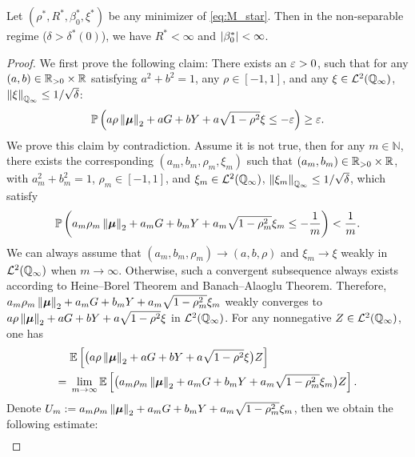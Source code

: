 \begin{lem}\label{lem:boundedness_parameter}
    Let $(\rho^*, R^*, \beta_0^*, \xi^*)$ be any minimizer of \cref{eq:M_star}. Then in the non-separable regime ($\delta > \delta^*(0)$), we have $R^* < \infty$ and $\left|{\beta_0^*}\right| < \infty$.
\end{lem}
\begin{proof}
    We first prove the following claim: There exists an $\varepsilon > 0$, such that for any $(a, b) \in \mathbb{R}_{> 0} \times \mathbb{R}$ satisfying $a^2 + b^2 = 1$, any $\rho \in [-1, 1]$, and any $\xi \in \mathcal{L}^2 (\mathbb{Q}_\infty)$, $\left\|{\xi}\right\|_{\mathbb{Q}_\infty} \le 1 / \sqrt{\delta}$:
    \begin{equation}
    \label{eq:V_claim}
        \mathbb{P} \left( a \rho \left\|{\text{\boldmath $\mu$}}\right\|_2 + a G + b Y + a \sqrt{1 - \rho^2} \xi \le - \varepsilon \right) \ge \varepsilon.
    \end{equation}
    We prove this claim by contradiction. Assume it is not true, then for any $m \in \mathbb{N}$, there exists the corresponding $(a_m, b_m, \rho_m, \xi_m)$ such that $(a_m, b_m) \in \mathbb{R}_{> 0} \times \mathbb{R}$, with $a_m^2 + b_m^2 = 1$, $\rho_m \in [-1, 1]$, and $\xi_m \in \mathcal{L}^2 (\mathbb{Q}_\infty)$, $\left\|{\xi_m}\right\|_{\mathbb{Q}_\infty} \le 1 / \sqrt{\delta}$, which satisfy
    \begin{equation}
    \label{eq:Vm_bound}
        \mathbb{P} \left( a_m \rho_m \left\|{\text{\boldmath $\mu$}}\right\|_2 + a_m G + b_m Y + a_m \sqrt{1 - \rho_m^2} \xi_m \le - \frac{1}{m} \right) < \frac{1}{m}.
    \end{equation}
    We can always assume that $(a_m, b_m, \rho_m) \to (a, b, \rho)$ and $\xi_m \to \xi$ weakly in $\mathcal{L}^2 (\mathbb{Q}_\infty)$ when $m \to \infty$. Otherwise, such a convergent subsequence always exists according to Heine--Borel Theorem and Banach--Alaoglu Theorem. Therefore, $a_m \rho_m \left\|{\text{\boldmath $\mu$}}\right\|_2 + a_m G + b_m Y + a_m \sqrt{1 - \rho_m^2} \xi_m$ weakly converges to $a \rho \left\|{\text{\boldmath $\mu$}}\right\|_2 + a G + b Y + a \sqrt{1 - \rho^2} \xi$ in $\mathcal{L}^2 (\mathbb{Q}_\infty)$. For any nonnegative $Z \in \mathcal{L}^2 (\mathbb{Q}_\infty)$, one has
    \begin{align*}
        & \mathbb{E} \left[ \bigl( a \rho \left\|{\text{\boldmath $\mu$}}\right\|_2 + a G + b Y + a \sqrt{1 - \rho^2} \xi \bigr) Z \right] \\
        = {} & \lim_{m \to \infty} \mathbb{E} \left[ \bigl( a_m \rho_m \left\|{\text{\boldmath $\mu$}}\right\|_2 + a_m G + b_m Y + a_m \sqrt{1 - \rho_m^2} \xi_m \bigr) Z \right].
    \end{align*}
    Denote $U_m := a_m \rho_m \left\|{\text{\boldmath $\mu$}}\right\|_2 + a_m G + b_m Y + a_m \sqrt{1 - \rho_m^2} \xi_m$, then we obtain the following estimate:
    \begin{align*}

\end{align*}
\end{proof}
